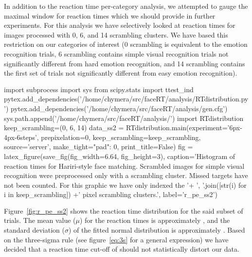 	    In addition to the reaction time per-category analysis, we attempted to gauge the maximal window for reaction times which we should provide in further experiments.
	    For this analysis we have selectively looked at reaction times for images processed with \SI{0}{\pixel}, \SI{6}{\pixel}, and \SI{14}{\pixel} scrambling clusters.
	    We have based this restriction on our categories of interest 
	    (\SI{0}{\pixel} scrambling is equivalent to the emotion recognition trials, \SI{6}{\pixel} scrambling contains simple visual recognition trials not significantly different from hard emotion recognition, and \SI{14}{\pixel} scrambling contains the first set of trials not significantly different from easy emotion recognition).
	    \begin{pycode}
		import subprocess
		import sys
		from scipy.stats import ttest_ind
		pytex.add_dependencies('/home/chymera/src/faceRT/analysis/RTdistribution.py')
		pytex.add_dependencies('/home/chymera/src/faceRT/analysis/gen.cfg')
		sys.path.append('/home/chymera/src/faceRT/analysis/')
		import RTdistribution
		keep_scrambling=(0, 6, 14)
		data_ss2 = RTdistribution.main(experiment='6px-4px-6steps', prepixelation=0, keep_scrambling=keep_scrambling, source='server', make_tight={"pad": 0}, print_title=False)
		fig = latex_figure(save_fig(fig_width=6.64, fig_height=3), caption='Histogram of reaction times for Hariri-style face matching. Scrambled images for simple visual recognition were preprocessed only with a scrambling cluster. Missed targets have not been counted. For this graphic we have only indexed the '+ ', '.join([str(i) for i in keep_scrambling]) +' pixel scrambling clusters.', label='r_pe_ss2')
	    \end{pycode}
	    
	    Figure~\ref{fig:r_pe_ss2} shows the reaction time distribution for the said subset of trials.
	    The mean value ($\mu$) for the reaction times is approximately , 
	    and the standard deviation ($\sigma$) of the fitted normal distribution is approximately .
	    Based on the three-sigma rule (see figure~\ref{eq:3s} for a general expression) we have decided that a reaction time cut-off of  should not statistically distort our data.
	    
